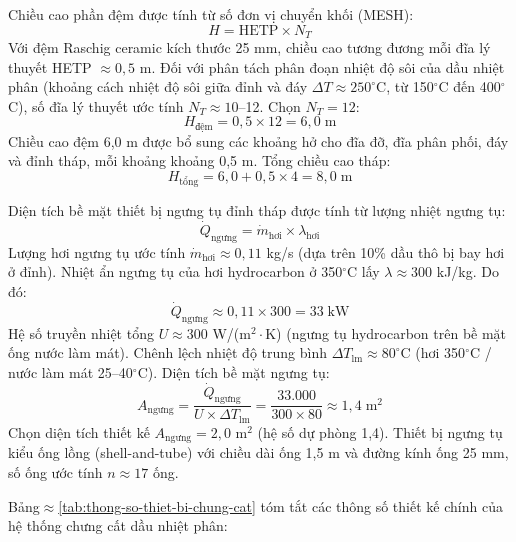 \documentclass[../main.tex]{subfiles}
\begin{document}
Chiều cao phần đệm được tính từ số đơn vị chuyển khối (MESH):
\begin{equation}
H = \text{HETP} \times N_T
\end{equation}
Với đệm Raschig ceramic kích thước 25 mm, chiều cao tương đương mỗi đĩa lý thuyết HETP $\approx 0{,}5$ m. Đối với phân tách phân đoạn nhiệt độ sôi của dầu nhiệt phân (khoảng cách nhiệt độ sôi giữa đỉnh và đáy $\Delta T \approx 250^\circ\mathrm{C}$, từ 150$^\circ$C đến 400$^\circ$C), số đĩa lý thuyết ước tính $N_T \approx 10$--12. Chọn $N_T = 12$:
\begin{equation}
H_{\text{đệm}} = 0{,}5 \times 12 = 6{,}0 \;\text{m}
\end{equation}
Chiều cao đệm 6,0 m được bổ sung các khoảng hở cho đĩa đỡ, đĩa phân phối, đáy và đỉnh tháp, mỗi khoảng khoảng 0,5 m. Tổng chiều cao tháp:
\begin{equation}
H_{\text{tổng}} = 6{,}0 + 0{,}5 \times 4 = 8{,}0 \;\text{m}
\end{equation}

Diện tích bề mặt thiết bị ngưng tụ đỉnh tháp được tính từ lượng nhiệt ngưng tụ:
\begin{equation}
\dot{Q}_{\text{ngưng}} = \dot{m}_{\text{hơi}} \times \lambda_{\text{hơi}}
\end{equation}
Lượng hơi ngưng tụ ước tính $\dot{m}_{\text{hơi}} \approx 0{,}11$ kg/s (dựa trên 10\% dầu thô bị bay hơi ở đỉnh). Nhiệt ẩn ngưng tụ của hơi hydrocarbon ở 350$^\circ$C lấy $\lambda \approx 300$ kJ/kg. Do đó:
\begin{equation}
\dot{Q}_{\text{ngưng}} \approx 0{,}11 \times 300 = 33 \;\text{kW}
\end{equation}
Hệ số truyền nhiệt tổng $U \approx 300$ W/(m$^2\cdot$K) (ngưng tụ hydrocarbon trên bề mặt ống nước làm mát). Chênh lệch nhiệt độ trung bình $\Delta T_{\text{lm}} \approx 80^\circ$C (hơi 350$^\circ$C / nước làm mát 25--40$^\circ$C). Diện tích bề mặt ngưng tụ:
\begin{equation}
A_{\text{ngưng}} = \frac{\dot{Q}_{\text{ngưng}}}{U \times \Delta T_{\text{lm}}} = \frac{33.000}{300 \times 80} \approx 1{,}4 \;\text{m}^2
\end{equation}
Chọn diện tích thiết kế $A_{\text{ngưng}} = 2{,}0$ m$^2$ (hệ số dự phòng 1,4). Thiết bị ngưng tụ kiểu ống lồng (shell-and-tube) với chiều dài ống 1,5 m và đường kính ống 25 mm, số ống ước tính $n \approx 17$ ống.

Bảng$\approx$\ref{tab:thong-so-thiet-bi-chung-cat} tóm tắt các thông số thiết kế chính của hệ thống chưng cất dầu nhiệt phân:
\end{document}
